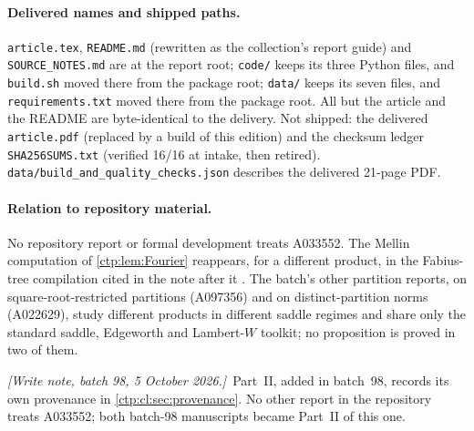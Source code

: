 \documentclass[11pt,a4paper]{article}
\numberwithin{equation}{section}
\theoremstyle{definition}
\theoremstyle{remark}
\newcommand{\writenoteB}[1]{\par\smallskip\noindent
 \textit{[Write note, batch 98, 5 October 2026.]}\ #1\par\smallskip}
\begin{document}
\paragraph{Delivered names and shipped paths.} \texttt{article.tex},
\texttt{README.md} (rewritten as the collection's report guide) and
\texttt{SOURCE\_NOTES.md} are at the report root; \texttt{code/} keeps
its three Python files, and \texttt{build.sh} moved there from the
package root; \texttt{data/} keeps its seven files, and
\texttt{requirements.txt} moved there from the package root. All but the
article and the README are byte-identical to the delivery. Not shipped:
the delivered \texttt{article.pdf} (replaced by a build of this
edition) and the checksum ledger \texttt{SHA256SUMS.txt} (verified 16/16
at intake, then retired). \texttt{data/build\_and\_quality\_checks.json}
describes the delivered 21-page PDF.

\paragraph{Relation to repository material.} No repository report or
formal development treats A033552. The Mellin computation of
\cref{ctp:lem:Fourier} reappears, for a different product, in the
Fabius-tree compilation cited in the note after it \cite{fabiusH}. The
batch's other partition reports, on square-root-restricted partitions
(A097356) and on distinct-partition norms (A022629), study different
products in different saddle regimes and share only the standard
saddle, Edgeworth and Lambert-$W$ toolkit; no proposition is proved in
two of them.

\writenoteB{Part~II, added in batch~98, records its own provenance in
\cref{ctp:cl:sec:provenance}. No other report in the repository treats
A033552; both batch-98 manuscripts became Part~II of this one.}
\end{document}
